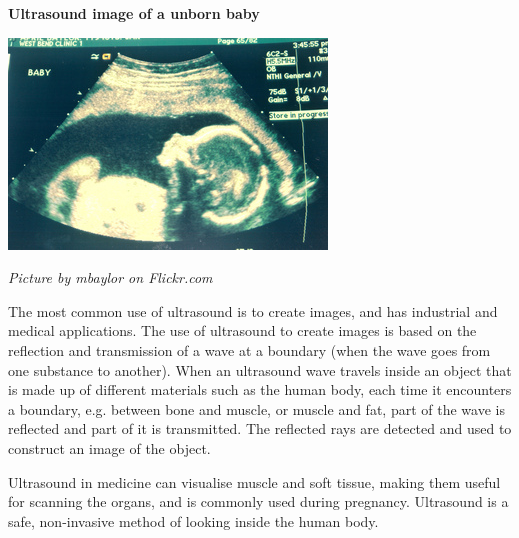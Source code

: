\begin{minipage}{.5\textwidth}
\begin{center}
\textbf{Ultrasound image of a unborn baby}\par
\includegraphics[width=.8\columnwidth]{photos/ultrasound_mbaylor_flickr.jpg}
\par\textit{Picture by mbaylor on Flickr.com}
\end{center}
\end{minipage}
\begin{minipage}{.5\textwidth}
      \label{m38800*id185140}The most common use of ultrasound is to create images, and has industrial and medical applications. The use of ultrasound to create images is based on the reflection and transmission of a wave at a boundary (when the wave goes from one substance to another). When an ultrasound wave travels inside an object that is made up of different materials such as the human body, each time it encounters a boundary, e.g.\@{} between bone and muscle, or muscle and fat, part of the wave is reflected and part of it is transmitted. The reflected rays are detected and used to construct an image of the object.\par 
      \label{m38800*id185148}Ultrasound in medicine can visualise muscle and soft tissue, making them useful for scanning the organs, and is commonly used during pregnancy. Ultrasound is a safe, non-invasive method of looking inside the human body.\par 
      
\end{minipage}

